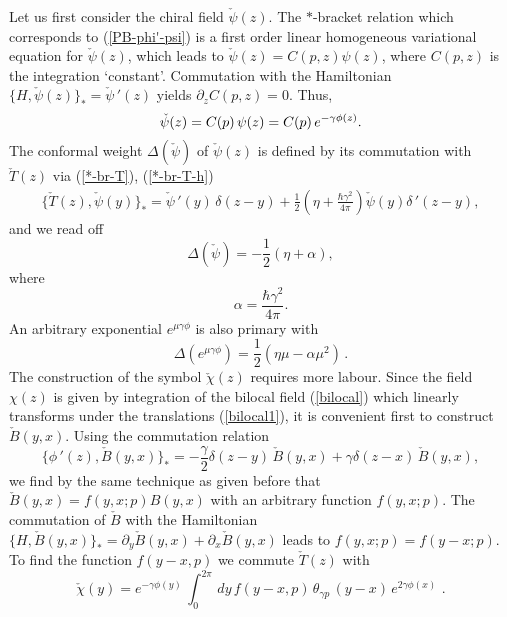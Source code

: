 \documentclass[a4paper,12pt]{article}
\begin{document}
\noindent
Let us first consider the chiral field $\check \psi (z)$. The
$*$-bracket relation which corresponds to (\ref{PB-phi'-psi}) is a
first order linear homogeneous variational equation for $\check \psi
(z)$, which leads to $\check \psi (z)=C(p,z)\psi (z)$, where
$C(p,z)$ is the integration `constant'.  Commutation with the
Hamiltonian $\{H,\check\psi(z)\}_*=\check\psi\,'(z)$ yields
$\partial_z C(p,z)=0$. Thus,
\begin{equation}\label{s-psi}
   {\check\psi}(z) =C(p) \, \psi(z)=C(p) \,
e^{-{\mathnormal\gamma}\phi(z)}.
\end{equation}
The conformal weight $\Delta(\check\psi)$ of $\check\psi (z)$
is defined by its commutation with $\check T (z)$ via (\ref{*-br-T}),
(\ref{*-br-T-h})
\begin{eqnarray}\label{*B-T-psi}
\{\check T (z),\check\psi(y)\}_*=\check\psi\,'(y)\,\delta (z-y) +
\frac{1}{2}
\left(\eta +
\frac{\hbar\gamma^2}{4\pi}\right)\check\psi(y)\delta\,'(z-y),
\end{eqnarray}
and we read off
\begin{equation}\label{delta-psi}
\Delta (\check\psi) =-\frac{1}{2}\left(\eta +
\alpha\right),
\end{equation}
where
\begin{equation}\label{alpha}
\alpha =\frac{\hbar\gamma^2}{4\pi}.
\end{equation}
An arbitrary exponential $e^{\mu\gamma\phi}$ is also primary with
\begin{equation}\label{delta-e}
\Delta (e^{\mu\gamma\phi}) =\frac{1}{2}(\eta\mu -\alpha\mu^2)\,.
\end{equation}
The construction of the symbol $\check\chi(z)$ requires more labour.
Since the field $\chi(z) $ is given by  integration of the bilocal
field (\ref{bilocal}) which linearly transforms under the translations
(\ref{bilocal1}), it is convenient first to construct $\check
B(y,x)$.  Using the commutation relation
\begin{equation}\label{bil-phi'}
\{\phi\,'(z), \check B(y,x)\}_*=-\frac{\gamma}{2}\delta(z-y)\,
\check B(y,x)+
\gamma \delta(z-x)\,\check B(y,x),
\end{equation}
 we find by the same
technique as given before that $\check B(y,x)=f(y,x;p)B(y,x)$
with an arbitrary function $f(y,x;p)$. The commutation of $\check B$
with the Hamiltonian
$\{H,\check B(y,x)\}_*=\partial_y\check B(y,x)+\partial_x\check B(y,x)$
leads to $f(y,x;p)=f(y-x;p)$.
To find the function
$f(y-x,p)$ we
commute $\check T(z)$ with
 \begin{equation}\label{s-chi}
{\check\chi}(y)= e^{-\gamma\phi (y)}\,\int_0^{2\pi}\,
dy\,f(y-x,p)\,\theta_{\gamma p}\, (y-x)\,e^{2\gamma\phi(x)}\,\,.
\end{equation}
\end{document}
